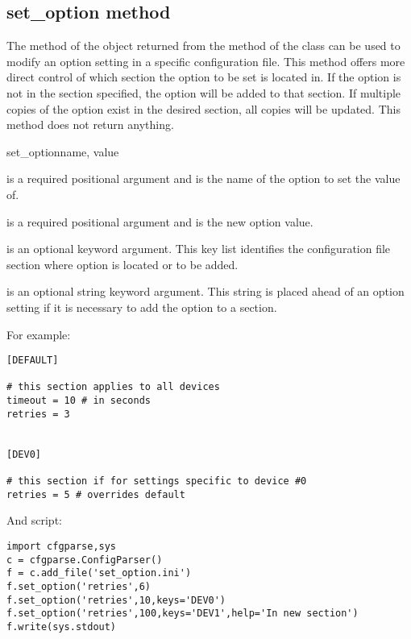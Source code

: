 \documentclass{howto}
\begin{document}
\subsection{set_option method\label{cfgparse-round-trip-set-option}}

The  method of the object returned from the  
method of the  class can be used to modify an option setting 
in a specific configuration file.  This method offers more direct control of 
which section the option to be set is located in.  If the option is not in the 
section specified, the option will be added to that section.  If multiple copies 
of the option exist in the desired section, all copies will be updated.  This 
method does not return anything.

  \begin{funcdesc}{set_option}{name, value}

     is a required positional argument and is the name of the
        option to set the value of.
        
     is a required positional argument and is the new option
        value.
        
     is an optional keyword argument.  This key list identifies
        the configuration file section where option is located or to be
        added.
  
     is an optional string keyword argument.  This string is
        placed ahead of an option setting if it is necessary to add the
        option to a section.
        
  \end{funcdesc}

For example:

\begin{verbatim}
[DEFAULT]

# this section applies to all devices
timeout = 10 # in seconds
retries = 3


[DEV0]

# this section if for settings specific to device #0
retries = 5 # overrides default
\end{verbatim}

And script:

\begin{verbatim}
import cfgparse,sys
c = cfgparse.ConfigParser()
f = c.add_file('set_option.ini')
f.set_option('retries',6)
f.set_option('retries',10,keys='DEV0')
f.set_option('retries',100,keys='DEV1',help='In new section')
f.write(sys.stdout)
\end{verbatim}
\end{document}
